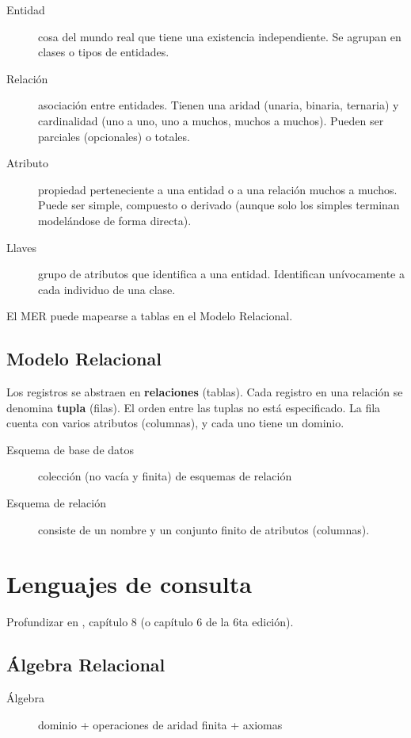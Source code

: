 \begin{description}
	\item[Entidad] cosa del mundo real que tiene una existencia independiente. Se agrupan en clases o tipos de entidades.
	\item[Relación] asociación entre entidades. Tienen una aridad (unaria, binaria, ternaria) y cardinalidad (uno a uno, uno a muchos, muchos a muchos). Pueden ser parciales (opcionales) o totales.
	\item[Atributo] propiedad perteneciente a una entidad o a una relación muchos a muchos. Puede ser simple, compuesto o derivado (aunque solo los simples terminan modelándose de forma directa).
	\item[Llaves] grupo de atributos que identifica a una entidad. Identifican unívocamente a cada individuo de una clase.
\end{description}

El MER puede mapearse a tablas en el Modelo Relacional.

\subsection{Modelo Relacional}

Los registros se abstraen en \textbf{relaciones} (tablas). Cada registro en una relación se denomina \textbf{tupla} (filas). El orden entre las tuplas no está especificado. La fila cuenta con varios atributos (columnas), y cada uno tiene un dominio.

\begin{description}
	\item[Esquema de base de datos] colección (no vacía y finita) de esquemas de relación
	\item[Esquema de relación] consiste de un nombre y un conjunto finito de atributos (columnas).
\end{description}

\section{Lenguajes de consulta}

Profundizar en \cite{elmasri2015}, capítulo 8 (o capítulo 6 de la 6ta edición).

\subsection{Álgebra Relacional}

\begin{description}
	\item[Álgebra] dominio + operaciones de aridad finita + axiomas
\end{description}

